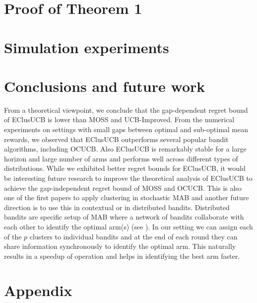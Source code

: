 \documentclass{article}
\begin{document}
\section{Proof of Theorem 1}
\label{sec:proofTheorem}

%
\section{Simulation experiments}
\label{sec:expts}

%
\section{Conclusions and future work}
\label{sec:conclusions}
From a theoretical viewpoint, we conclude that the gap-dependent regret bound of EClusUCB is lower than MOSS and UCB-Improved. From the numerical experiments on settings with small gaps between optimal and sub-optimal mean rewards, we observed that EClusUCB outperforms several popular bandit algorithms,  including OCUCB. Also EClusUCB is remarkably stable for a large horizon and large number of arms and performs well across different types of distributions. While we exhibited better regret bounds for EClusUCB, it would be interesting future research to improve the theoretical analysis of EClusUCB to achieve the gap-independent regret bound of MOSS and OCUCB. This is also one of the first papers to apply clustering in stochastic MAB and another future direction is to use this in contextual or in distributed bandits. Distributed bandits are specific setup of MAB where a network of bandits collaborate with each other to identify the optimal arm(s) (see \citet{awerbuch2008competitive,liu2010distributed,szorenyi2013gossip,hillel2013distributed}). In our setting we can assign each of the $p$ clusters to individual bandits and at the end of each round they can share information synchronously to identify the optimal arm. This naturally results in a speedup of operation and helps in identifying the best arm faster. 


\clearpage
\newpage






\clearpage
\newpage
\onecolumn
\section*{Appendix}

\end{document}
